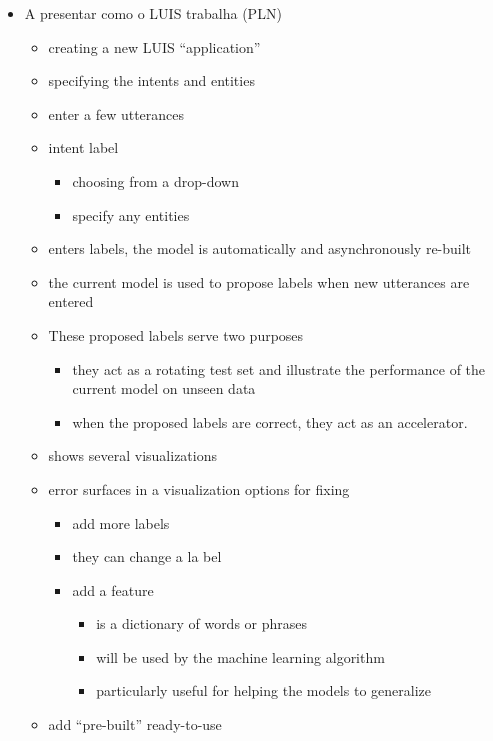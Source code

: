 \begin{itemize}
	\item A presentar como o LUIS trabalha (PLN)

		\begin{itemize}
			\item creating a new LUIS “application”
			\item specifying the intents and entities
			\item enter a few utterances
			\item intent label
				\begin{itemize}
					\item choosing from a drop-down
					\item specify any entities
				\end{itemize}

			\item enters labels, the model is automatically and asynchronously re-built
			\item the current model is used to propose labels when new utterances are entered
			\item These proposed labels serve two purposes
				\begin{itemize}
					\item they act as a rotating test set and illustrate the performance of the current model on unseen data
					\item when the proposed labels are correct, they act as an accelerator.
				\end{itemize}
			\item shows several visualizations
			\item error surfaces in a visualization options for fixing
				\begin{itemize}
					\item add more labels
					\item they can change a la bel
					\item add a feature
						\begin{itemize}
							\item is a dictionary of words or phrases
							\item will be used by the machine learning algorithm
							\item particularly useful for helping the models to generalize
						\end{itemize}
				\end{itemize}
			\item add “pre-built” ready-to-use
				\begin{itemize}

\end{itemize}
\end{itemize}
\end{itemize}
